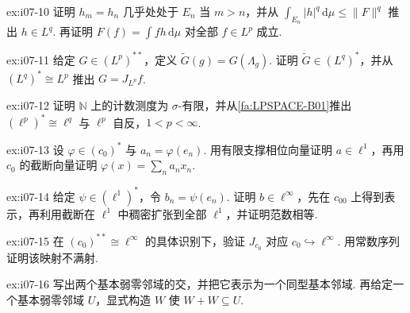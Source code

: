 \begin{FAExercise}[全局密度拼接]{ex:i07-10}
证明 \(\displaystyle h_m=h_n\) 几乎处处于 \(\displaystyle E_n\) 当 \(\displaystyle m>n\)，并从 \(\displaystyle \int_{E_n}|h|^q\,\mathrm{d}\mu\leqslant\|F\|^q\) 推出 \(\displaystyle h\in L^q\). 再证明 \(\displaystyle F(f)=\int fh\,\mathrm{d}\mu\) 对全部 \(\displaystyle f\in L^p\) 成立.
\end{FAExercise}

\begin{FAExercise}{ex:i07-11}
给定 \(\displaystyle G\in(L^p)^{**}\)，定义 \(\displaystyle \widetilde G(g)=G(\Lambda_g)\). 证明 \(\displaystyle \widetilde G\in(L^q)^*\)，并从 \(\displaystyle (L^q)^*\cong L^p\) 推出 \(\displaystyle G=J_{L^p}f\).
\end{FAExercise}

\begin{FAExercise}{ex:i07-12}
证明 \(\displaystyle \mathbb N\) 上的计数测度为 \(\displaystyle \sigma\)-有限，并从\autoref{fa:LPSPACE-B01}推出 \(\displaystyle (\ell^p)^*\cong\ell^q\) 与 \(\displaystyle \ell^p\) 自反，\(\displaystyle 1<p<\infty\).
\end{FAExercise}

\begin{FAExercise}{ex:i07-13}
设 \(\displaystyle \varphi\in(c_0)^*\) 与 \(\displaystyle a_n=\varphi(e_n)\). 用有限支撑相位向量证明 \(\displaystyle a\in\ell^1\)，再用 \(\displaystyle c_0\) 的截断向量证明 \(\displaystyle \varphi(x)=\sum_na_nx_n\).
\end{FAExercise}

\begin{FAExercise}{ex:i07-14}
给定 \(\displaystyle \psi\in(\ell^1)^*\)，令 \(\displaystyle b_n=\psi(e_n)\). 证明 \(\displaystyle b\in\ell^\infty\)，先在 \(\displaystyle c_{00}\) 上得到表示，再利用截断在 \(\displaystyle \ell^1\) 中稠密扩张到全部 \(\displaystyle \ell^1\)，并证明范数相等.
\end{FAExercise}

\begin{FAExercise}{ex:i07-15}
在 \(\displaystyle (c_0)^{**}\cong\ell^\infty\) 的具体识别下，验证 \(\displaystyle J_{c_0}\) 对应 \(\displaystyle c_0\hookrightarrow\ell^\infty\). 用常数序列证明该映射不满射.
\end{FAExercise}

\begin{FAExercise}[基本弱邻域的有限交]{ex:i07-16}
写出两个基本弱零邻域的交，并把它表示为一个同型基本邻域. 再给定一个基本弱零邻域 \(\displaystyle U\)，显式构造 \(\displaystyle W\) 使 \(\displaystyle W+W\subseteq U\).
\end{FAExercise}

